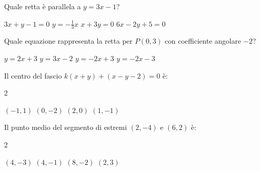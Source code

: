 \documentclass[a4paper,10pt]{exam}
\begin{document}
\begin{questions}
\question Quale retta è parallela a $y=3x-1$?
\vspace{0.2em}
\begin{choices}
\choice $3x+y-1=0$
\choice $y=-\frac13x$
\choice $x+3y=0$
\choice $6x-2y+5=0$
\end{choices}

\question Quale equazione rappresenta la retta per $P(0,3)$ con coefficiente angolare $-2$?
\vspace{0.2em}
\begin{choices}
\choice $y=2x+3$
\choice $y=3x-2$
\choice $y=-2x+3$
\choice $y=-2x-3$
\end{choices}

\question Il centro del fascio $k(x+y)+(x-y-2)=0$ è:
\vspace{0.2em}
\begin{multicols}{2}
\begin{choices}
\choice $(-1,1)$
\choice $(0,-2)$
\choice $(2,0)$
\choice $(1,-1)$
\end{choices}
\end{multicols}

\question Il punto medio del segmento di estremi $(2,-4)$ e $(6,2)$ è:
\vspace{0.2em}
\begin{multicols}{2}
\begin{choices}
\choice $(4,-3)$
\choice $(4,-1)$
\choice $(8,-2)$
\choice $(2,3)$
\end{choices}
\end{multicols}

\end{questions}
\end{document}

